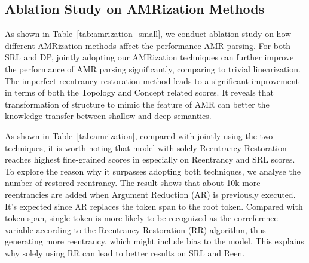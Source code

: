 \documentclass[11pt]{article}
\begin{document}
\subsection{Ablation Study on AMRization Methods}



As shown in Table~\ref{tab:amrization_small}, we conduct ablation study on how different AMRization methods affect the performance AMR parsing. For both SRL and DP,  jointly adopting our AMRization techniques can further improve the performance of AMR parsing significantly, comparing to trivial linearization. The imperfect reentrancy restoration method leads to a significant improvement in terms of both the Topology and Concept related scores. It reveals that transformation of structure to mimic the feature of AMR can better the knowledge transfer between shallow and deep semantics.

As shown in Table~\ref{tab:amrization}, compared with jointly using the two techniques, it is worth noting that model with solely Reentrancy Restoration reaches highest fine-grained scores in especially on Reentrancy and SRL scores. To explore the reason why it surpasses adopting both techniques, we analyse the number of restored reentrancy. The result shows that about 10k more reentrancies are added when Argument Reduction (AR) is previously executed. It's expected since AR replaces the token span to the root token. Compared with token span, single token is more likely to be recognized as the correference variable according to the Reentrancy Restoration (RR) algorithm, thus generating more reentrancy, which might include bias to the model. This explains why solely using RR can lead to better results on SRL and Reen. 













        
\end{document}
